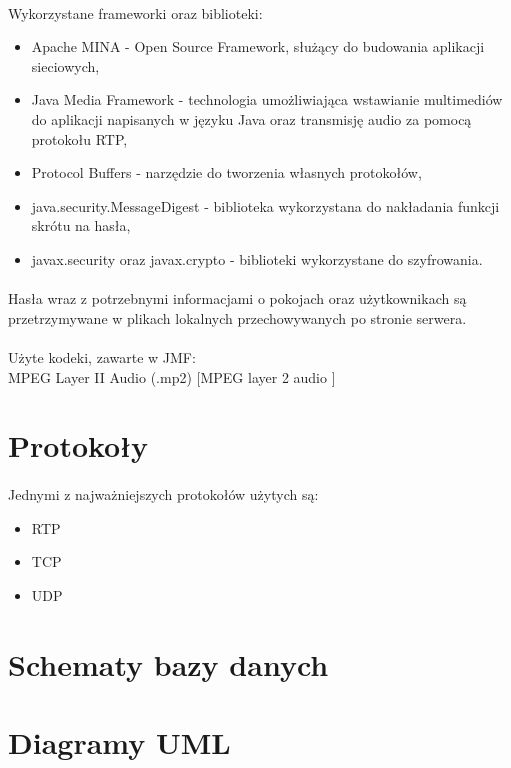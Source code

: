 \documentclass[12pt,a4paper,notitlepage]{report}
\begin{document}
	\paragraph*{} Wykorzystane frameworki oraz biblioteki:
	\begin{itemize}
		\item Apache MINA - Open Source Framework, służący do budowania aplikacji sieciowych,
		\item Java Media Framework - technologia umożliwiająca wstawianie multimediów do aplikacji napisanych w języku Java oraz transmisję audio za pomocą protokołu RTP,
		\item Protocol Buffers - narzędzie do tworzenia własnych protokołów,
		\item java.security.MessageDigest - biblioteka wykorzystana do nakładania funkcji skrótu na hasła,
		\item javax.security oraz javax.crypto - biblioteki wykorzystane do szyfrowania.
	\end{itemize}
	\paragraph*{} Hasła wraz z potrzebnymi informacjami o pokojach oraz użytkownikach są przetrzymywane w plikach lokalnych przechowywanych po stronie serwera.
	\paragraph*{} Użyte kodeki, zawarte w JMF:\\ MPEG Layer II Audio (.mp2) [MPEG layer 2 audio ]
	\section{Protokoły}
	\paragraph*{} Jednymi z najważniejszych protokołów użytych są:
	\begin{itemize}
		\item RTP
		\item TCP
		\item UDP
	\end{itemize}
	\section{Schematy bazy danych}
	\section{Diagramy UML}
\end{document}

